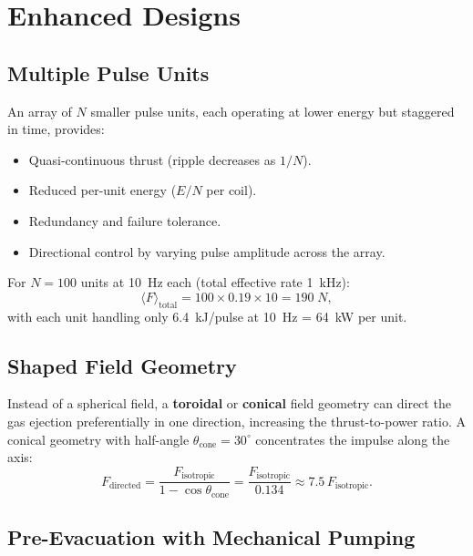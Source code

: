 \documentclass[amsmath,amssymb,aps,prd,superscriptaddress,nofootinbib]{revtex4-2}
\begin{document}
\section{Enhanced Designs}\label{sec:enhanced}

\subsection{Multiple Pulse Units}

An array of $N$ smaller pulse units, each operating at lower energy
but staggered in time, provides:
\begin{itemize}
\item Quasi-continuous thrust (ripple decreases as $1/N$).
\item Reduced per-unit energy ($E/N$ per coil).
\item Redundancy and failure tolerance.
\item Directional control by varying pulse amplitude across the array.
\end{itemize}

For $N = 100$ units at 10~Hz each (total effective rate 1~kHz):
\begin{equation}
\langle F \rangle_\text{total} = 100 \times 0.19 \times 10 = 190 \; \si{N},
\end{equation}
with each unit handling only 6.4~kJ/pulse at 10~Hz = 64~kW per unit.

\subsection{Shaped Field Geometry}

Instead of a spherical field, a \textbf{toroidal} or \textbf{conical}
field geometry can direct the gas ejection preferentially in one
direction, increasing the thrust-to-power ratio. A conical geometry
with half-angle $\theta_\text{cone} = 30^\circ$ concentrates the
impulse along the axis:
\begin{equation}
F_\text{directed} = \frac{F_\text{isotropic}}{1 - \cos\theta_\text{cone}}
= \frac{F_\text{isotropic}}{0.134}
\approx 7.5 \, F_\text{isotropic}.
\end{equation}

\subsection{Pre-Evacuation with Mechanical Pumping}
\end{document}
